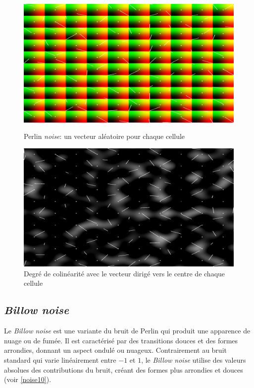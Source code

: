 \begin{figure}[h]
  \begin{minipage}[b]{0.45\linewidth}
    \centering
    \includegraphics[width=\linewidth]{images/noise/noise12.JPG}
    \caption{Perlin \textit{noise}: un vecteur aléatoire pour chaque cellule}
    \label{noise12}
  \end{minipage}
  \hspace{0.1\linewidth} %
  \begin{minipage}[b]{0.45\linewidth}
    \centering
    \includegraphics[width=\linewidth]{images/noise/noise13.JPG}
    \caption{Degré de colinéarité avec le vecteur dirigé vers le centre de chaque cellule}
    \label{noise13}
  \end{minipage}
\end{figure}


\subsection*{\textit{Billow noise}}
Le \textit{Billow noise} est une variante du bruit de Perlin qui produit une apparence de nuage ou de fumée. Il est caractérisé par des transitions douces et des formes arrondies, donnant un aspect ondulé ou nuageux. Contrairement au bruit standard qui varie linéairement entre $-1$ et $1$, le \textit{Billow noise} utilise des valeurs absolues des contributions du bruit, créant des formes plus arrondies et douces (voir \ref{noise10}).

